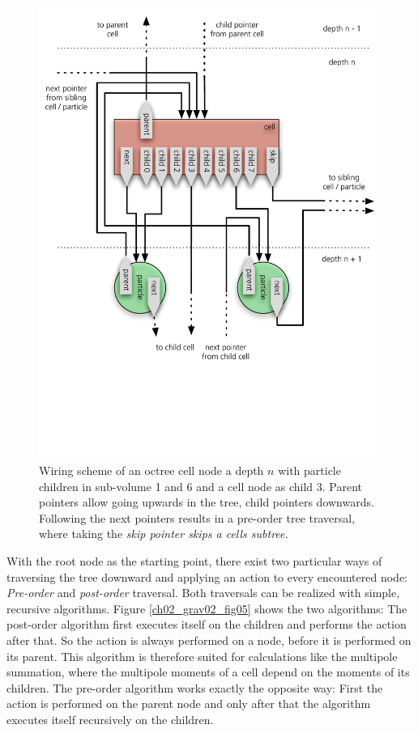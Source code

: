 \begin{figure}[htbp]
\begin{center}
\includegraphics[scale=0.6]{11cell_wiring.pdf}
\caption{Wiring scheme of an octree cell node a depth $n$ with particle children in sub-volume 1 and 6 and a cell node as child 3. Parent pointers allow going upwards in the tree, child pointers downwards. Following the next pointers results in a pre-order tree traversal, where taking the \it{skip} pointer skips a cells subtree.}
\label{ch02_fig11}
\end{center}
\end{figure}

With the root node as the starting point, there exist two particular ways of traversing the tree downward and applying an action to every encountered node: \emph{Pre-order} and \emph{post-order} traversal. Both traversals can be realized with simple, recursive algorithms. Figure \ref{ch02_grav02_fig05} shows the two algorithms: The post-order algorithm first executes itself on the children and performs the action after that. So the action is always performed on a node, before it is performed on its parent. This algorithm is therefore suited for calculations like the multipole summation, where the multipole moments of a cell depend on the moments of its children. The pre-order algorithm works exactly the opposite way: First the action is performed on the parent node and only after that the algorithm executes itself recursively on the children.

